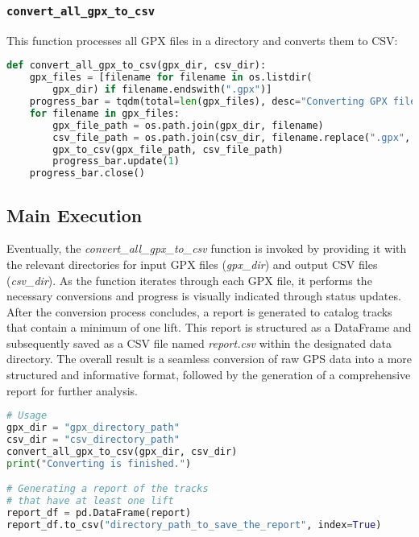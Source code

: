 \subsubsection{\texttt{convert\_all\_gpx\_to\_csv}}

This function processes all GPX files in a directory and converts them to CSV:

\begin{lstlisting}[language=Python]
def convert_all_gpx_to_csv(gpx_dir, csv_dir):
    gpx_files = [filename for filename in os.listdir(
        gpx_dir) if filename.endswith(".gpx")]
    progress_bar = tqdm(total=len(gpx_files), desc="Converting GPX files")
    for filename in gpx_files:
        gpx_file_path = os.path.join(gpx_dir, filename)
        csv_file_path = os.path.join(csv_dir, filename.replace(".gpx", ".csv"))
        gpx_to_csv(gpx_file_path, csv_file_path)
        progress_bar.update(1)
    progress_bar.close()
\end{lstlisting}

\subsection{Main Execution}
\label{sec:data:main}

Eventually, the \textit{convert\_all\_gpx\_to\_csv} function is invoked by providing it with the relevant directories for input GPX files (\textit{gpx\_dir}) and output CSV files (\textit{csv\_dir}). 
As the function iterates through each GPX file, it performs the necessary conversions and progress is visually indicated through status updates. After the conversion process concludes, 
a report is generated to catalog tracks that contain a minimum of one lift. This report is structured as a DataFrame and subsequently saved as a CSV file named 
\textit{report.csv} within the designated data directory. The overall result is a seamless conversion of raw 
GPS data into a more structured and informative format, followed by the generation of a comprehensive report for further analysis.

\begin{lstlisting}[language=Python]
# Usage
gpx_dir = "gpx_directory_path"
csv_dir = "csv_directory_path"
convert_all_gpx_to_csv(gpx_dir, csv_dir)
print("Converting is finished.")

# Generating a report of the tracks 
# that have at least one lift
report_df = pd.DataFrame(report)
report_df.to_csv("directory_path_to_save_the_report", index=True)
\end{lstlisting}


